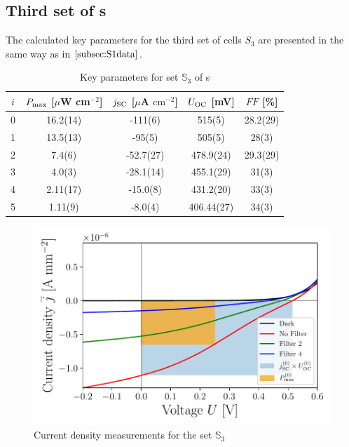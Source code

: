 \subsection{Third set of \BHSC s}

The calculated key parameters for the third set of cells $S_3$ are presented in the same way as in $\ref{subsec:S1data}$.

\begin{table}[h]\centering
\caption{Key parameters for set $\mathbb{S}_3$ of \BHSC s}
\label{tab:keyparams3}
\begin{tabular}{@{}ccccc@{}}\toprule
$i$ & $P_{\text{max}}$ [$\mu$W cm$^{-2}$] & $j_{\text{SC}}$ [$\mu$A $\mathrm{cm}^{-2}$] & $U_{\text{OC}}$ [mV] & $FF$ [\%]\\\midrule
0 &   16.2(14)  &  -111(6)  & 515(5) & 28.2(29) \\
1 &   13.5(13)  &  -95(5)  & 505(5) & 28(3) \\
2 &   7.4(6)  &  -52.7(27)  & 478.9(24) & 29.3(29) \\
3 &   4.0(3)  &  -28.1(14)  & 455.1(29) & 31(3) \\
4 &   2.11(17)  &  -15.0(8)  & 431.2(20) & 33(3)\\
5 &  1.11(9)  &  -8.0(4)  & 406.44(27) & 34(3) \\\bottomrule
\end{tabular}
\end{table}

\begin{figure}[h]\centering
\includegraphics[width=\columnwidth]{../../../IV-Curve-Analysis/OSC2Graph.pdf}
\caption{Current density measurements for the set $\mathbb{S}_3$}
\label{fig:OSC3Graph}
\end{figure}

